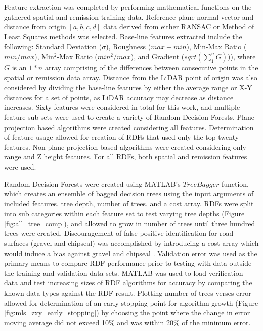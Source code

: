 \documentclass[journal,onecolumn]{IEEEtran}
\begin{document}
	{Feature extraction was completed by performing mathematical functions on the gathered spatial and remission training data. Reference plane normal vector and distance from origin $[a,b,c,d]$ data derived from either RANSAC or Method of Least Squares methods was selected. Base-line features extracted include the following: Standard Deviation ($\sigma$), Roughness ($max - min$), Min-Max Ratio ($min / max$), Min$^{2}$-Max Ratio ($min^2 / max$), and Gradient ($sqrt(\sum_{1}^{n} G))$), where $G$ is an $1*n$ array comprising of the differences between consecutive points in the spatial or remission data array. Distance from the LiDAR point of origin was also considered by dividing the base-line features by either the average range or X-Y distances for a set of points, as LiDAR accuracy may decrease as distance increases. Sixty features were considered in total for this work, and multiple feature sub-sets were used to create a variety of Random Decision Forests. Plane-projection based algorithms were created considering all features. Determination of feature usage allowed for creation of RDFs that used only the top twenty features. Non-plane projection based algorithms were created considering only range and Z height features. For all RDFs, both spatial and remission features were used. } 
	
	{Random Decision Forests were created using MATLAB's $TreeBagger$ function, which creates an ensemble of bagged decision trees using the input arguments of included features, tree depth, number of trees, and a cost array. RDFs were split into sub categories within each feature set to test varying tree depths (Figure \ref{fig:all_tree_comp}), and allowed to grow in number of trees until three hundred trees were created. Discouragement of false-positive identification for road surfaces (gravel and chipseal) was accomplished by introducing a cost array which would induce a bias against gravel and chipseal . Validation error was used as the primary means to compare RDF performance prior to testing with data outside the training and validation data sets. MATLAB was used to load verification data and test increasing sizes of RDF algorithms for accuracy by comparing the known data types against the RDF result. Plotting number of trees verses error allowed for determination of an early stopping point for algorithm growth (Figure \ref{fig:mls_zxy_early_stopping}) by choosing the point where the change in error moving average did not exceed 10\% and was within 20\% of the minimum error.}
	
\end{document}
